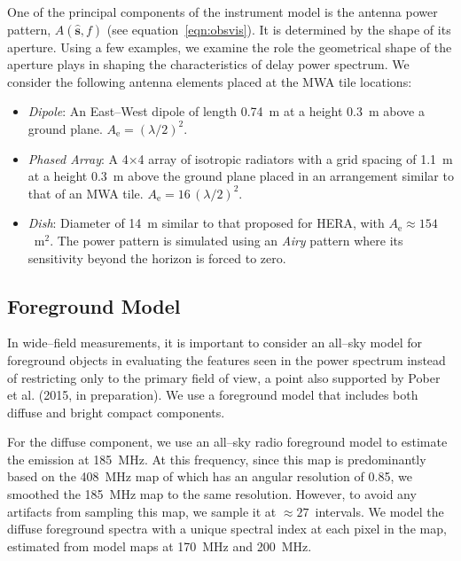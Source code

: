 \documentclass[preprint2,iop,numberedappendix,twocolappendix,appendixfloats]{emulateapj}
\begin{document}
One of the principal components of the instrument model is the antenna power pattern, $A(\hat{\boldsymbol{s}},f)$ (see equation~\ref{eqn:obsvis}). It is determined by the shape of its aperture. Using a few examples, we examine the role the geometrical shape of the aperture plays in shaping the characteristics of delay power spectrum. We consider the following antenna elements placed at the MWA tile locations:
\begin{itemize}
\item {\it Dipole}: An East--West dipole of length 0.74~m at a height 0.3~m above a ground plane. $A_\textrm{e}=(\lambda/2)^2$.
\item {\it Phased Array}: A 4$\times$4 array of isotropic radiators with a grid spacing of 1.1~m at a height 0.3~m above the ground plane placed in an arrangement similar to that of an MWA tile. $A_\textrm{e}=16\,(\lambda/2)^2$. 
\item {\it Dish}: Diameter of 14~m similar to that proposed for HERA, with $A_\textrm{e}\approx 154$~m$^2$. The power pattern is simulated using an {\it Airy} pattern where its sensitivity beyond the horizon is forced to zero.
\end{itemize}


\subsection{Foreground Model}\label{sec:foreground}

In wide--field measurements, it is important to consider an all--sky model for foreground objects in evaluating the features seen in the power spectrum instead of restricting only to the primary field of view, a point also supported by Pober et al. (2015, in preparation). We use a foreground model that includes both diffuse and bright compact components. 


For the diffuse component, we use an all--sky radio foreground model \citep{deo08} to estimate the emission at 185~MHz. At this frequency, since this map is predominantly based on the 408~MHz map of \citet{has82} which has an angular resolution of 0.85\arcdeg, we smoothed the 185~MHz map to the same resolution. However, to avoid any artifacts from sampling this map, we sample it at $\approx 27$\arcmin~intervals. We model the diffuse foreground spectra with a unique spectral index at each pixel in the map, estimated from model maps at 170~MHz and 200~MHz.
\end{document}
